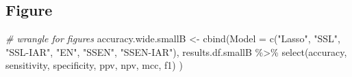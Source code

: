 \documentclass[
]{article}
\newenvironment{Shaded}{\begin{snugshade}}{\end{snugshade}}
\newcommand{\AttributeTok}[1]{\textcolor[rgb]{0.77,0.63,0.00}{#1}}
\newcommand{\CommentTok}[1]{\textcolor[rgb]{0.56,0.35,0.01}{\textit{#1}}}
\newcommand{\FunctionTok}[1]{\textcolor[rgb]{0.00,0.00,0.00}{#1}}
\newcommand{\NormalTok}[1]{#1}
\newcommand{\OtherTok}[1]{\textcolor[rgb]{0.56,0.35,0.01}{#1}}
\newcommand{\SpecialCharTok}[1]{\textcolor[rgb]{0.00,0.00,0.00}{#1}}
\newcommand{\StringTok}[1]{\textcolor[rgb]{0.31,0.60,0.02}{#1}}
\begin{document}
\hypertarget{figure-1}{%
\subsection{Figure}\label{figure-1}}

\begin{Shaded}
\begin{Highlighting}[]
\CommentTok{\# wrangle for figures}
\NormalTok{accuracy.wide.smallB }\OtherTok{\textless{}{-}} \FunctionTok{cbind}\NormalTok{(}\AttributeTok{Model =} \FunctionTok{c}\NormalTok{(}\StringTok{"Lasso"}\NormalTok{, }\StringTok{"SSL"}\NormalTok{, }\StringTok{"SSL{-}IAR"}\NormalTok{,}
                             \StringTok{"EN"}\NormalTok{, }\StringTok{"SSEN"}\NormalTok{, }\StringTok{"SSEN{-}IAR"}\NormalTok{),}
\NormalTok{                       results.df.smallB }\SpecialCharTok{\%\textgreater{}\%} \FunctionTok{select}\NormalTok{(accuracy, sensitivity, specificity,}
\NormalTok{                                             ppv, npv, mcc, f1)}
\NormalTok{)}


\end{Highlighting}
\end{Shaded}
\end{document}
